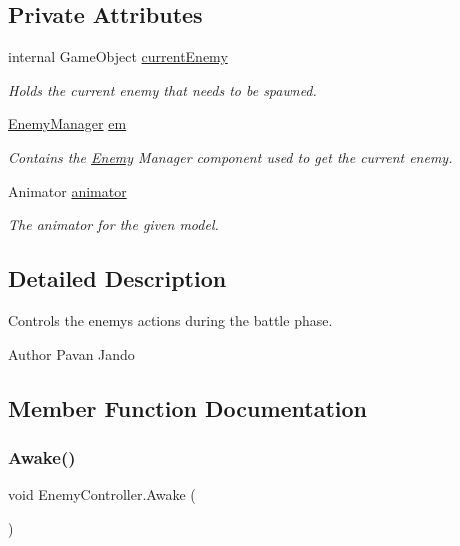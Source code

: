 \subsection*{Private Attributes}
\begin{DoxyCompactItemize}
\item 
internal Game\+Object \mbox{\hyperlink{class_enemy_controller_ad0b526d9df2f637161b6dd2a6738c71b}{current\+Enemy}}
\begin{DoxyCompactList}\small\item\em Holds the current enemy that needs to be spawned. \end{DoxyCompactList}\item 
\mbox{\hyperlink{class_enemy_manager}{Enemy\+Manager}} \mbox{\hyperlink{class_enemy_controller_a3faca011d32d7cdca33f05f27f1c431e}{em}}
\begin{DoxyCompactList}\small\item\em Contains the \mbox{\hyperlink{class_enemy}{Enemy}} Manager component used to get the current enemy. \end{DoxyCompactList}\item 
Animator \mbox{\hyperlink{class_enemy_controller_a8eba5438edc982ca7aa19493d0376412}{animator}}
\begin{DoxyCompactList}\small\item\em The animator for the given model. \end{DoxyCompactList}\end{DoxyCompactItemize}


\subsection{Detailed Description}
Controls the enemy\textquotesingle{}s actions during the battle phase. 

\begin{DoxyAuthor}{Author}
Pavan Jando
\end{DoxyAuthor}


\subsection{Member Function Documentation}
\mbox{\label{class_enemy_controller_af64c9a5242284f2b4794e8e471e60f4c}} 
\subsubsection{\texorpdfstring{Awake()}{Awake()}}
{\footnotesize\ttfamily void Enemy\+Controller.\+Awake (\begin{DoxyParamCaption}{ }\end{DoxyParamCaption})\hspace{0.3cm}{\ttfamily [private]}}



